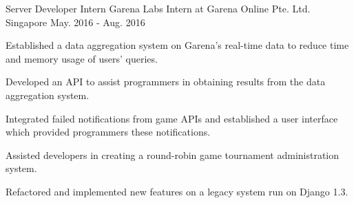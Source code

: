 

\begin{cventries}

	\cventry
	{Server Developer Intern} %
	{Garena Labs Intern at Garena Online Pte. Ltd.} %
	{Singapore} %
	{May. 2016 - Aug. 2016} %
	{
		\begin{cvitems} %
		\item {Established a data aggregation system on Garena's real-time data to reduce time and memory usage of users' queries.}
		\item {Developed an API to assist programmers in obtaining results from the data aggregation system.}
		\item {Integrated failed notifications from game APIs and established a user interface which provided programmers these notifications.}
		\item {Assisted developers in creating a round-robin game tournament administration system.}
		\item {Refactored and implemented new features on a legacy system run on Django 1.3.}
		\end{cvitems}
	}

\end{cventries}
